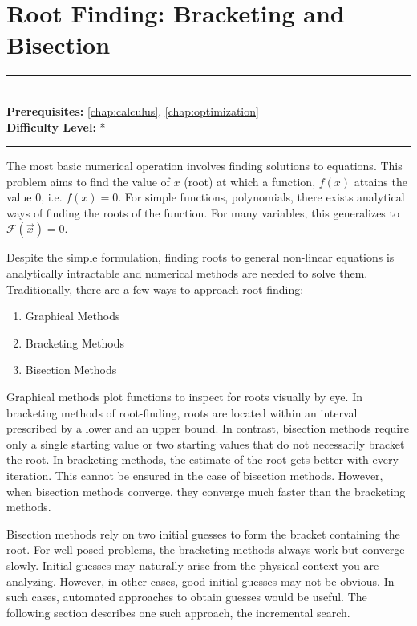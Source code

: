 \documentclass[book.tex]{subfiles}
\begin{document}
\chapter{Root Finding: Bracketing and Bisection}
\label{chap:bracketing}
\noindent\rule{11cm}{0.4pt} \\
\textbf{Prerequisites:} \autoref{chap:calculus}, \autoref{chap:optimization} \\
\textbf{Difficulty Level:} * \\
\noindent\rule{11cm}{0.4pt}
\vspace{5mm}

The most basic numerical operation involves finding solutions to equations.  This problem aims to find the value of $x$ (root) at which a function, $f(x)$ attains the value $0$, i.e. $f(x) = 0$.  For simple functions, polynomials, there exists analytical ways of finding the roots of the function.  For many variables, this generalizes to $\mathcal{F}(\vec{x}) = 0$.

Despite the simple formulation, finding roots to general non-linear equations is analytically intractable and numerical methods are needed to solve them.  Traditionally, there are a few ways to approach root-finding:

\begin{enumerate}
\item Graphical Methods
\item Bracketing Methods
\item Bisection Methods
\end{enumerate}

Graphical methods plot functions to inspect for roots visually by eye. In bracketing methods of root-finding, roots are located within an interval prescribed by a lower and an upper bound. In contrast, bisection methods require only a single starting value or two starting values that do not necessarily bracket the root. In bracketing methods, the estimate of the root gets better with every iteration. This cannot be ensured in the case of bisection methods. However, when bisection methods converge, they converge much faster than the bracketing methods. 

Bisection methods rely on two initial guesses to form the bracket containing the root. For well-posed problems, the bracketing methods always work but converge slowly. Initial guesses may naturally arise from the physical context you are analyzing. However, in other cases, good initial guesses may not be obvious. In such cases, automated approaches to obtain guesses would be useful. The following section describes one such approach, the incremental search.
\end{document}
